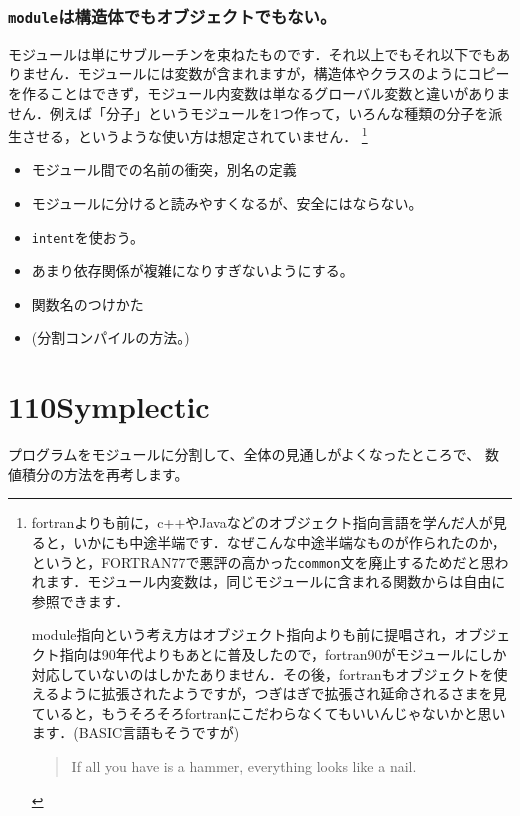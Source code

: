 \documentclass[a4,10pt]{article}
\begin{document}
\subsubsection{{\tt module}は構造体でもオブジェクトでもない。}
モジュールは単にサブルーチンを束ねたものです．それ以上でもそれ以下でもありません．モジュールには変数が含まれますが，構造体やクラスのようにコピーを作ることはできず，モジュール内変数は単なるグローバル変数と違いがありません．例えば「分子」というモジュールを1つ作って，いろんな種類の分子を派生させる，というような使い方は想定されていません．
\footnote{fortranよりも前に，c++やJavaなどのオブジェクト指向言語を学んだ人が見ると，いかにも中途半端です．なぜこんな中途半端なものが作られたのか，というと，FORTRAN77で悪評の高かった{\tt common}文を廃止するためだと思われます．モジュール内変数は，同じモジュールに含まれる関数からは自由に参照できます．

module指向という考え方はオブジェクト指向よりも前に提唱され，オブジェクト指向は90年代よりもあとに普及したので，fortran90がモジュールにしか対応していないのはしかたありません．その後，fortranもオブジェクトを使えるように拡張されたようですが，つぎはぎで拡張され延命されるさまを見ていると，もうそろそろfortranにこだわらなくてもいいんじゃないかと思います．(BASIC言語もそうですが)
\begin{quote}
If all you have is a hammer, everything looks like a nail.
\end{quote}
}
\begin{itemize}
\item モジュール間での名前の衝突，別名の定義
\item モジュールに分けると読みやすくなるが、安全にはならない。
\item {\tt intent}を使おう。
\item あまり依存関係が複雑になりすぎないようにする。
\item 関数名のつけかた
\item (分割コンパイルの方法。)
\end{itemize}



\section{110Symplectic}

プログラムをモジュールに分割して、全体の見通しがよくなったところで、
数値積分の方法を再考します。
\end{document}
